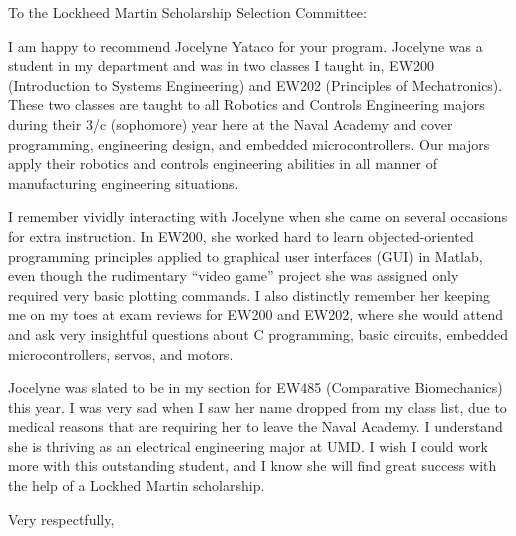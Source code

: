 \documentclass[12pt]{wrceletter}
\date{\today}
\begin{document}
\begin{letter}{%
}

\opening{To the Lockheed Martin Scholarship Selection Committee:}
\raggedright %
\setlength{\parindent}{15pt} %

I am happy to recommend Jocelyne Yataco for your program. Jocelyne was a student in my department and was in two classes I taught in, EW200 (Introduction to Systems Engineering) and EW202 (Principles of Mechatronics). These two classes are taught to all Robotics and Controls Engineering majors during their 3/c (sophomore) year here at the Naval Academy and cover programming, engineering design, and embedded microcontrollers. Our majors apply their robotics and controls engineering abilities in all manner of manufacturing engineering situations.   

I remember vividly interacting with Jocelyne when she came on several occasions for extra instruction. In EW200, she worked hard to learn objected-oriented programming principles applied to graphical user interfaces (GUI) in Matlab, even though the rudimentary ``video game'' project she was assigned only required very basic plotting commands. I also distinctly remember her keeping me on my toes at exam reviews for EW200 and EW202, where she would attend and ask very insightful questions about C programming, basic circuits, embedded microcontrollers, servos, and motors. 

Jocelyne was slated to be in my section for EW485 (Comparative Biomechanics) this year. I was very sad when I saw her name dropped from my class list, due to medical reasons that are requiring her to leave the Naval Academy. I understand she is thriving as an electrical engineering major at UMD. I wish I could work more with this outstanding student, and I know she will find great success with the help of a Lockhed Martin scholarship.



\closing{Very respectfully,} %

\end{letter}
\end{document}
